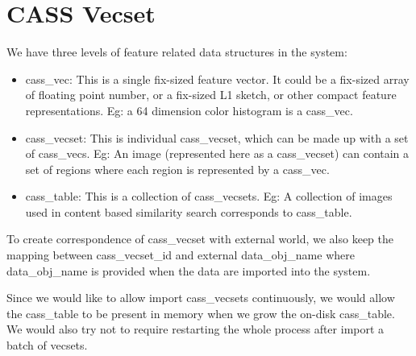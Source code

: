 %       
% 
% 
% 
\section{CASS Vecset}

We have three levels of feature related data structures in the system:
\begin{itemize}
\item cass\_vec: This is a single fix-sized feature vector. It could
  be a fix-sized array of floating point number, or a fix-sized L1
  sketch, or other compact feature representations. Eg: a 64 dimension
  color histogram is a cass\_vec.
\item cass\_vecset: This is individual cass\_vecset, which can be made up
  with a set of cass\_vecs. Eg: An image (represented here as a
  cass\_vecset) can contain a set of regions  where each region is
  represented by a cass\_vec.
\item cass\_table: This is a collection of cass\_vecsets. Eg:
  A collection of images used in content based similarity search
  corresponds to cass\_table.
\end{itemize}

To create correspondence of cass\_vecset with external world, we also
keep the mapping between cass\_vecset\_id and external data\_obj\_name
where data\_obj\_name is provided when the data are imported into the system.

Since we would like to allow import cass\_vecsets continuously, we would
allow the cass\_table to be present in memory when we grow the on-disk 
cass\_table. We would also try not to require restarting the whole
process after import a batch of vecsets.

